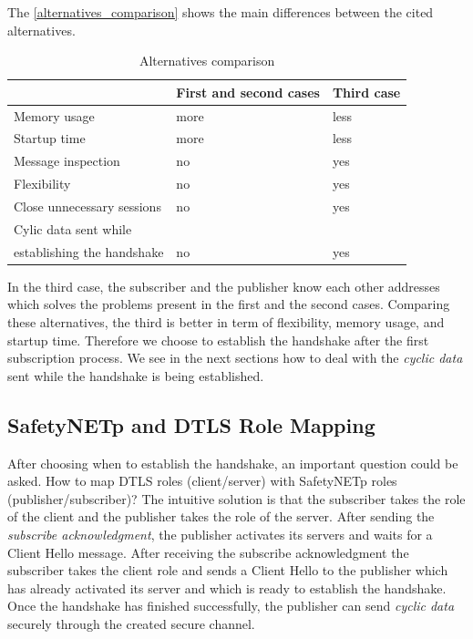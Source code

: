The \autoref{alternatives_comparison} shows the main differences between the cited alternatives.

\begin{table}[H]
  \centering
    \begin{tabular}{|l|l|l|}
      \hline
      & First and second cases & Third case \\
      \hline
      Memory usage & more & less \\
      \hline
      Startup time & more & less \\
      \hline
      Message inspection & no & yes \\
      \hline
      Flexibility & no & yes \\
      \hline
      Close unnecessary sessions & no & yes \\
      \hline
      Cylic data sent while & &\\
      establishing the handshake & no & yes \\
      \hline
  \end{tabular}
  \caption{Alternatives comparison}\label{alternatives_comparison}
\end{table}


In the third case, the subscriber and the publisher know each other addresses which solves the problems present in the first and the second cases. Comparing these alternatives, the third is better in term of
flexibility, memory usage, and startup time. Therefore we choose to establish the handshake after the first subscription process.
We see in the next sections how to deal with the \textit{cyclic data} sent while the handshake is being established.


\subsection{SafetyNETp and DTLS Role Mapping}

After choosing when to establish the handshake, an important question could be asked.
How to map DTLS roles (client/server) with SafetyNETp roles (publisher/subscriber)?
The intuitive solution is that the subscriber takes the role of the client and the publisher
takes the role of the server. After sending the \textit{subscribe acknowledgment}, the publisher
activates its servers and waits for a Client Hello message. After receiving the subscribe
acknowledgment the subscriber takes the client role and sends a Client Hello to the publisher
which has already activated its server and which is ready to establish the handshake. Once the handshake
has finished successfully, the publisher can send \textit{cyclic data} securely through the created secure channel.



